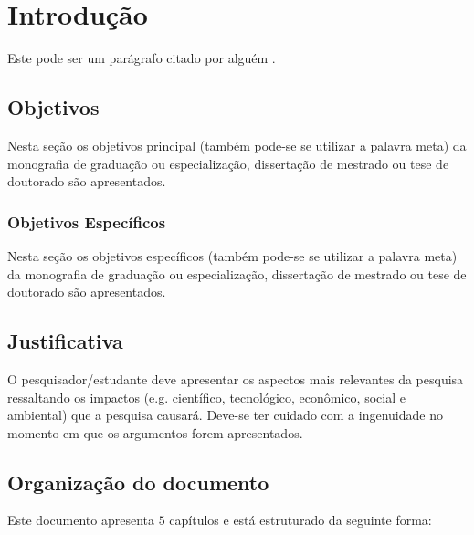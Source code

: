 \chapter{Introdução}
\label{chap:intro}

Este pode ser um parágrafo citado por alguém \cite{Barabasi2003-1}.

\section{Objetivos}
\label{sec:obj}

Nesta se\c{c}\~ao os objetivos principal (tamb\'em
pode-se se utilizar a palavra meta) da monografia de
gradua\c{c}\~ao ou especializa\c{c}\~ao, disserta\c{c}\~ao de
mestrado ou tese de doutorado s\~ao apresentados.


\subsection{Objetivos Específicos}
\label{ssec:objesp}

Nesta se\c{c}\~ao os objetivos espec\'ificos (tamb\'em
pode-se se utilizar a palavra meta) da monografia de
gradua\c{c}\~ao ou especializa\c{c}\~ao, disserta\c{c}\~ao de
mestrado ou tese de doutorado s\~ao apresentados.


\section{Justificativa}
\label{sec:justi}

O pesquisador/estudante deve apresentar os aspectos mais
relevantes da pesquisa ressaltando os impactos (e.g. cient\'ifico,
tecnol\'ogico, econ\^omico, social e ambiental) que a pesquisa
causar\'a. Deve-se ter cuidado com a ingenuidade no momento em que
os argumentos forem apresentados.




\section{Organização do documento}
\label{section:organizacao}

Este documento apresenta $5$ capítulos e está estruturado da seguinte forma:

